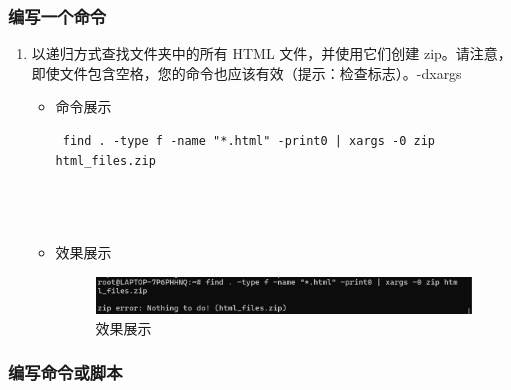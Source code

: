 \documentclass[UTF8]{ctexart}
\begin{document}
\subsubsection{编写一个命令}

\begin{enumerate}
  \item 以递归方式查找文件夹中的所有 HTML 文件，并使用它们创建 zip。请注意，即使文件包含空格，您的命令也应该有效（提示：检查标志）。-dxargs
  \begin{itemize}
  \item 命令展示
  \begin{verbatim}
 find . -type f -name "*.html" -print0 | xargs -0 zip html_files.zip


    
  \end{verbatim}

  \item 效果展示
  \begin{figure}[H]
    \centering
    \includegraphics[width=\textwidth]{4} %
    \caption{效果展示}
  
  \end{figure}
\end{itemize}
\end{enumerate}









\subsubsection{编写命令或脚本}
\end{document}
